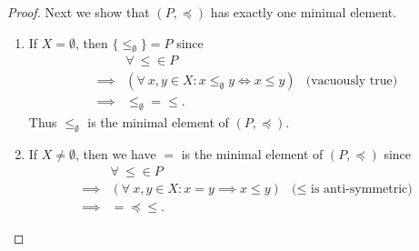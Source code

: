 \begin{proof}
    Next we show that \((P, \preceq)\) has exactly one minimal element.
    \begin{enumerate}
        \item If \(X = \emptyset\), then \(\{\leq_{\emptyset}\} = P\) since
              \begin{align*}
                           & \forall\ \leq \in P                                                                  \\
                  \implies & (\forall\ x, y \in X : x \leq_{\emptyset} y \iff x \leq y) & \text{(vacuously true)} \\
                  \implies & \leq_{\emptyset} = \leq.
              \end{align*}
              Thus \(\leq_{\emptyset}\) is the minimal element of \((P, \preceq)\).
        \item If \(X \neq \emptyset\), then we have \(=\) is the minimal element of \((P, \preceq)\) since
              \begin{align*}
                           & \forall\ \leq \in P                                                                   \\
                  \implies & (\forall\ x, y \in X : x = y \implies x \leq y) & \text{(\(\leq\) is anti-symmetric)} \\
                  \implies & = \preceq \leq.
              \end{align*}
    \end{enumerate}


\end{proof}
